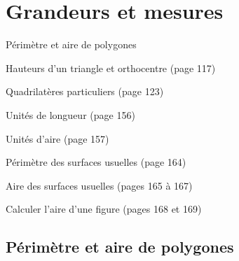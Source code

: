 \documentclass[a4paper,11pt]{report}
\begin{document}
\newcommand{\chapterName}{Grandeurs et mesures}
\newcommand{\serieName}{Périmètre et aire de polygones}


\chapter*{\chapterName}
\thispagestyle{empty}

\begin{amL}{\serieName}{

\item Hauteurs d'un triangle et orthocentre (page 117)
\item Quadrilatères particuliers (page 123)
\item Unités de longueur (page 156)
\item Unités d'aire (page 157)
\item Périmètre des surfaces usuelles (page 164)
\item Aire des surfaces usuelles (pages 165 à 167)
\item Calculer l'aire d'une figure (pages 168 et 169)
}
\end{amL}
\section*{\serieName}
\setcounter{page}{1}
\thispagestyle{firstPage}







\end{document}

